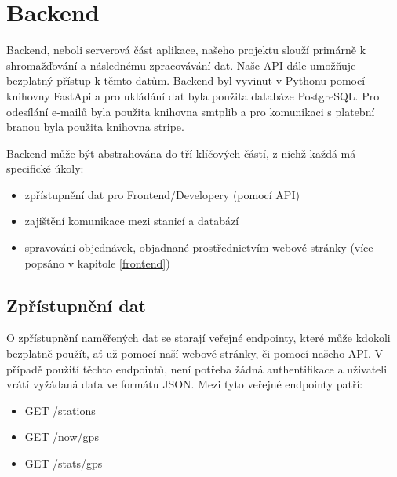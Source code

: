\section{Backend}
Backend, neboli serverová část aplikace, našeho projektu slouží primárně k shromažďování a následnému zpracovávání dat. Naše API dále umožňuje bezplatný přístup k těmto datům.
Backend byl vyvinut v Pythonu pomocí knihovny FastApi a pro ukládání dat byla použita databáze PostgreSQL.
Pro odesílání e-mailů byla použita knihovna smtplib a pro komunikaci s platební branou byla použita knihovna stripe. 

Backend může být abstrahována do tří klíčových částí, z nichž každá má specifické úkoly: 
\begin{itemize}
  \item zpřístupnění dat pro Frontend/Developery (pomocí API) 
  \item zajištění komunikace mezi stanicí a databází 
  \item spravování objednávek, objadnané prostřednictvím webové stránky (více popsáno v kapitole \ref{frontend})  
\end{itemize}

\subsection{Zpřístupnění dat}
O zpřístupnění naměřených dat se starají veřejné endpointy, které může kdokoli bezplatně použít, ať už pomocí naší webové stránky, či pomocí našeho API. 
V případě použití těchto endpointů, není potřeba žádná authentifikace a uživateli vrátí vyžádaná data ve formátu JSON. Mezi tyto veřejné endpointy patří:
\begin{itemize}
  \item GET /stations
  \item GET /now/{gps} 
  \item GET /stats/{gps}
\end{itemize}

